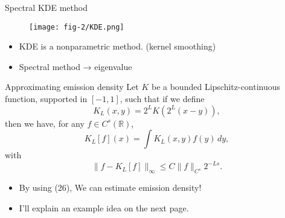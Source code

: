 \documentclass[10pt, aspectratio=169]{beamer}
\begin{document}
\begin{frame}{Spectral KDE method}
    \begin{figure}[h]
        \centering
        \texttt{[image: fig-2/KDE.png]}
    \end{figure}


    \begin{itemize}[label=\scalebox{0.5}{$\blacksquare$}]
        \item KDE is a nonparametric method. (kernel smoothing)
        \item Spectral method → eigenvalue
    \end{itemize}
\end{frame}
\begin{frame}
    \begin{mytheorembox}{Approximating emission density}
    Let \(K\) be a bounded Lipschitz-continuous function, supported in \([-1,1]\), such that if we define
    \begin{equation}
        K_L(x,y) = 2^L K(2^L(x-y)), \tag{25}
        \end{equation}
    then we have, for any \(f \in C^s(\mathbb{R})\),
    \begin{equation*}
        K_L[f](x) = \int K_L(x,y) f(y) \, dy,
        \end{equation*}
    with
    \begin{equation}
        \|f - K_L[f]\|_\infty \leq C \|f\|_{C^s} 2^{-Ls}. \tag{26}
        \end{equation}
    \end{mytheorembox}
    \begin{itemize}[label=\scalebox{0.5}{$\blacksquare$}]
        \vspace{1.5em}
        \itemsep1.2em
        \item By using (26), We can estimate emission density!
        \item I'll explain an example idea on the next page.
    \end{itemize}
\end{frame}
\end{document}
